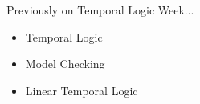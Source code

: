 
\begin{frame}{Previously on Temporal Logic Week...}
  
  \begin{itemize}

    \item{
    	Temporal Logic
    	}

    \item{
    	Model Checking
    	}

    \item{
    	Linear Temporal Logic
    	}

  \end{itemize}

\end{frame}